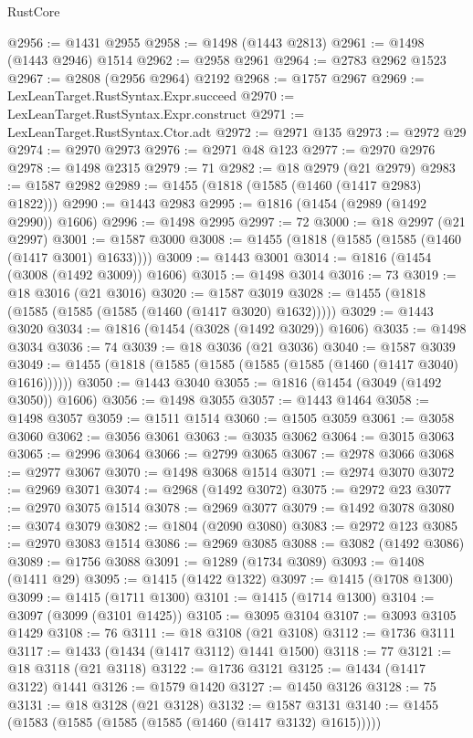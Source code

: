 \begin{lexlean}{RustCore}
\begin{coremodule}
@2956 := @1431 @2955
@2958 := @1498 (@1443 @2813)
@2961 := @1498 (@1443 @2946) @1514
@2962 := @2958 @2961
@2964 := @2783 @2962 @1523
@2967 := @2808 (@2956 @2964) @2192
@2968 := @1757 @2967
@2969 := LexLeanTarget.RustSyntax.Expr.succeed
@2970 := LexLeanTarget.RustSyntax.Expr.construct
@2971 := LexLeanTarget.RustSyntax.Ctor.adt
@2972 := @2971 @135
@2973 := @2972 @29
@2974 := @2970 @2973
@2976 := @2971 @48 @123
@2977 := @2970 @2976
@2978 := @1498 @2315
@2979 := 71
@2982 := @18 @2979 (@21 @2979)
@2983 := @1587 @2982
@2989 := @1455 (@1818 (@1585 (@1460 (@1417 @2983) @1822)))
@2990 := @1443 @2983
@2995 := @1816 (@1454 (@2989 (@1492 @2990)) @1606)
@2996 := @1498 @2995
@2997 := 72
@3000 := @18 @2997 (@21 @2997)
@3001 := @1587 @3000
@3008 := @1455 (@1818 (@1585 (@1585 (@1460 (@1417 @3001) @1633))))
@3009 := @1443 @3001
@3014 := @1816 (@1454 (@3008 (@1492 @3009)) @1606)
@3015 := @1498 @3014
@3016 := 73
@3019 := @18 @3016 (@21 @3016)
@3020 := @1587 @3019
@3028 := @1455 (@1818 (@1585 (@1585 (@1585 (@1460 (@1417 @3020) @1632)))))
@3029 := @1443 @3020
@3034 := @1816 (@1454 (@3028 (@1492 @3029)) @1606)
@3035 := @1498 @3034
@3036 := 74
@3039 := @18 @3036 (@21 @3036)
@3040 := @1587 @3039
@3049 := @1455 (@1818 (@1585 (@1585 (@1585 (@1585 (@1460 (@1417 @3040) @1616))))))
@3050 := @1443 @3040
@3055 := @1816 (@1454 (@3049 (@1492 @3050)) @1606)
@3056 := @1498 @3055
@3057 := @1443 @1464
@3058 := @1498 @3057
@3059 := @1511 @1514
@3060 := @1505 @3059
@3061 := @3058 @3060
@3062 := @3056 @3061
@3063 := @3035 @3062
@3064 := @3015 @3063
@3065 := @2996 @3064
@3066 := @2799 @3065
@3067 := @2978 @3066
@3068 := @2977 @3067
@3070 := @1498 @3068 @1514
@3071 := @2974 @3070
@3072 := @2969 @3071
@3074 := @2968 (@1492 @3072)
@3075 := @2972 @23
@3077 := @2970 @3075 @1514
@3078 := @2969 @3077
@3079 := @1492 @3078
@3080 := @3074 @3079
@3082 := @1804 (@2090 @3080)
@3083 := @2972 @123
@3085 := @2970 @3083 @1514
@3086 := @2969 @3085
@3088 := @3082 (@1492 @3086)
@3089 := @1756 @3088
@3091 := @1289 (@1734 @3089)
@3093 := @1408 (@1411 @29)
@3095 := @1415 (@1422 @1322)
@3097 := @1415 (@1708 @1300)
@3099 := @1415 (@1711 @1300)
@3101 := @1415 (@1714 @1300)
@3104 := @3097 (@3099 (@3101 @1425))
@3105 := @3095 @3104
@3107 := @3093 @3105 @1429
@3108 := 76
@3111 := @18 @3108 (@21 @3108)
@3112 := @1736 @3111
@3117 := @1433 (@1434 (@1417 @3112) @1441 @1500)
@3118 := 77
@3121 := @18 @3118 (@21 @3118)
@3122 := @1736 @3121
@3125 := @1434 (@1417 @3122) @1441
@3126 := @1579 @1420
@3127 := @1450 @3126
@3128 := 75
@3131 := @18 @3128 (@21 @3128)
@3132 := @1587 @3131
@3140 := @1455 (@1583 (@1585 (@1585 (@1585 (@1460 (@1417 @3132) @1615)))))

\end{coremodule}
\end{lexlean}
